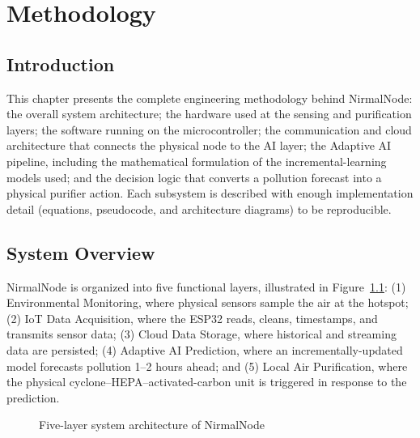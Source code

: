 \chapter{Methodology}
\label{ch:methodology}

\section{Introduction}
\label{sec:meth-intro}

This chapter presents the complete engineering methodology behind NirmalNode: the overall system architecture; the hardware used at the sensing and purification layers; the software running on the microcontroller; the communication and cloud architecture that connects the physical node to the AI layer; the Adaptive AI pipeline, including the mathematical formulation of the incremental-learning models used; and the decision logic that converts a pollution forecast into a physical purifier action. Each subsystem is described with enough implementation detail (equations, pseudocode, and architecture diagrams) to be reproducible.

\section{System Overview}
\label{sec:meth-overview}

NirmalNode is organized into five functional layers, illustrated in Figure~\ref{fig:five-layer}: (1) Environmental Monitoring, where physical sensors sample the air at the hotspot; (2) IoT Data Acquisition, where the ESP32 reads, cleans, timestamps, and transmits sensor data; (3) Cloud Data Storage, where historical and streaming data are persisted; (4) Adaptive AI Prediction, where an incrementally-updated model forecasts pollution 1--2 hours ahead; and (5) Local Air Purification, where the physical cyclone--HEPA--activated-carbon unit is triggered in response to the prediction.

\begin{figure}[htbp]
\centering
{}
\caption{Five-layer system architecture of NirmalNode}
\label{fig:five-layer}
\end{figure}

